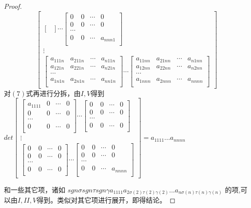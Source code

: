 \documentclass[twoside,a4paper,CCT]{cctart}   %
\begin{document}
\begin{proof}
$$\begin{bmatrix}
\begin{bmatrix}
\end{bmatrix}
\cdots
 \begin{bmatrix}
   0& 0&\cdots&0\\
   0& 0&\cdots&0\\
 \cdots\\
0& 0&\cdots&a_{nnn1}\\
\end{bmatrix}\\
\vdots\\
\begin{bmatrix}
  a_{111n}& a_{211n}&\cdots&a_{n11n}\\
  a_{121n}& a_{221n}&\cdots&a_{n21n}\\
  \cdots\\
  a_{1n1n}& a_{2n1n}&\cdots&a_{nn1n}\\
  \end{bmatrix}
\cdots
\begin{bmatrix}
  a_{11nn}& a_{21nn}&\cdots&a_{n1nn}\\
  a_{12nn}& a_{22nn}&\cdots&a_{n2nn}\\
   \cdots\\
   a_{1nnn}& a_{2nnn}&\cdots&a_{nnnn}\\
\end{bmatrix}
\end{bmatrix}$$
对$(7)$式再进行分拆，由$I,V$得到
$det \begin{bmatrix}
 \begin{bmatrix}
   a_{1111}& 0&\cdots&0\\
   0& 0&\cdots&0\\
 \cdots\\
0& 0&\cdots&0\\
\end{bmatrix}
\cdots
\begin{bmatrix}
  0& 0&\cdots&0\\
  0& 0&\cdots&0\\
 \cdots\\
 0& 0&\cdots&0\\
 \end{bmatrix}\\
\vdots\\
\begin{bmatrix}
  0& 0&\cdots&0\\
  0& 0&\cdots&0\\
   \cdots\\
   0& 0&\cdots&0\\
   \end{bmatrix}
\cdots
\begin{bmatrix}
  0& 0&\cdots&0\\
  0& 0&\cdots&0\\
   \cdots\\
   0& 0&\cdots&a_{nnnn}\\
   \end{bmatrix}
   \end{bmatrix}
    =a_{1111}...a_{nnnn}$


    和一些其它项，诸如
    $sgn\sigma sgn\tau sgn\gamma  a_{1111}a_{2\sigma(2)\tau(2)\gamma(2)}...a_{n\sigma(n)\tau(n)\gamma(n)}$
    的项,可以由$I,II,V$得到。类似对其它项进行展开，即得结论。
\end{proof}
\end{document}
